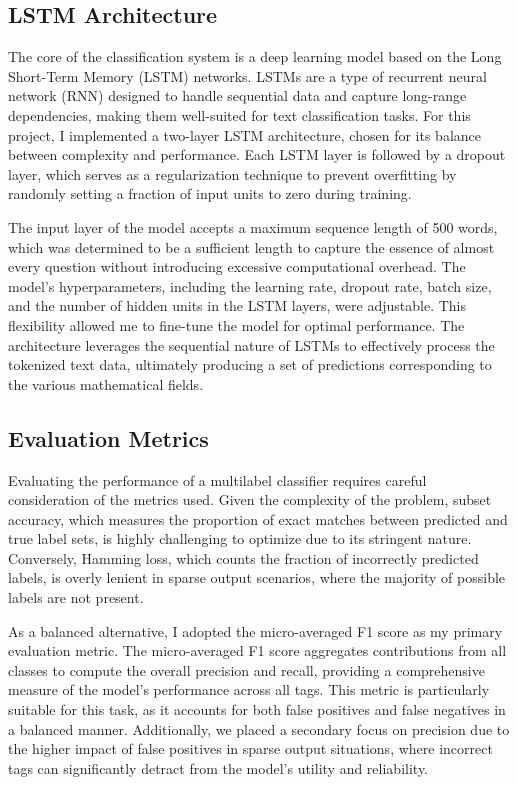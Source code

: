 \documentclass[12pt, letterpaper]{article}
\begin{document}
\subsection{LSTM Architecture}
The core of the classification system is a deep learning model based on the Long Short-Term Memory (LSTM) networks. LSTMs are a type of recurrent neural network (RNN) designed to handle sequential data and capture long-range dependencies, making them well-suited for text classification tasks. For this project, I implemented a two-layer LSTM architecture, chosen for its balance between complexity and performance. Each LSTM layer is followed by a dropout layer, which serves as a regularization technique to prevent overfitting by randomly setting a fraction of input units to zero during training.

The input layer of the model accepts a maximum sequence length of 500 words, which was determined to be a sufficient length to capture the essence of almost every question without introducing excessive computational overhead. The model's hyperparameters, including the learning rate, dropout rate, batch size, and the number of hidden units in the LSTM layers, were adjustable. This flexibility allowed me to fine-tune the model for optimal performance. The architecture leverages the sequential nature of LSTMs to effectively process the tokenized text data, ultimately producing a set of predictions corresponding to the various mathematical fields.
\subsection{Evaluation Metrics}
 Evaluating the performance of a multilabel classifier requires careful consideration of the metrics used. Given the complexity of the problem, subset accuracy, which measures the proportion of exact matches between predicted and true label sets, is highly challenging to optimize due to its stringent nature. Conversely, Hamming loss, which counts the fraction of incorrectly predicted labels, is overly lenient in sparse output scenarios, where the majority of possible labels are not present.
\par As a balanced alternative, I adopted the micro-averaged F1 score as my primary evaluation metric. The micro-averaged F1 score aggregates contributions from all classes to compute the overall precision and recall, providing a comprehensive measure of the model's performance across all tags. This metric is particularly suitable for this task, as it accounts for both false positives and false negatives in a balanced manner. Additionally, we placed a secondary focus on precision due to the higher impact of false positives in sparse output situations, where incorrect tags can significantly detract from the model's utility and reliability.
\end{document}
